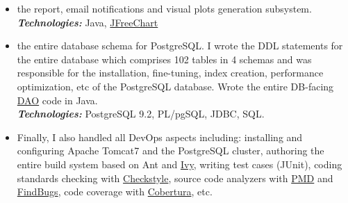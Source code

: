 \documentclass[10pt,a4paper]{article} %
\newcommand{\technologies}[0]{\textbf{\textit{Technologies:}}}
\begin{document}
{{{\begin{itemize}
    \\
    \technologies{} Java, XML, XSD, XPath 2.0 (Saxon), HTTP.
  \item the report, email notifications and visual plots generation subsystem.
    \\
    \technologies{} Java, \href{http://www.jfree.org/jfreechart/}{JFreeChart}
    \item the entire database schema for PostgreSQL. I wrote the DDL statements for the entire database which comprises 102 tables in 4 schemas and was responsible for the installation, fine-tuning, index creation, performance optimization, etc of the PostgreSQL database. Wrote the entire DB-facing \href{https://en.wikipedia.org/wiki/Database_abstraction_layer}{DAO} code in Java.\\
      \technologies{} PostgreSQL 9.2, PL/pgSQL, JDBC, SQL.
    \item Finally, I also handled all DevOps aspects including: installing and configuring Apache Tomcat7 and the PostgreSQL cluster, authoring the entire build system based on
      Ant and \href{http://ant.apache.org/ivy/}{Ivy}, writing test cases (JUnit), coding standards checking with \href{http://checkstyle.sourceforge.net/}{Checkstyle}, source code analyzers with
      \href{https://pmd.github.io/}{PMD} and \href{http://findbugs.sourceforge.net/}{FindBugs},
      code coverage with \href{http://cobertura.github.io/cobertura/}{Cobertura}, etc.
  \end{itemize}

}}

}

\end{document}
